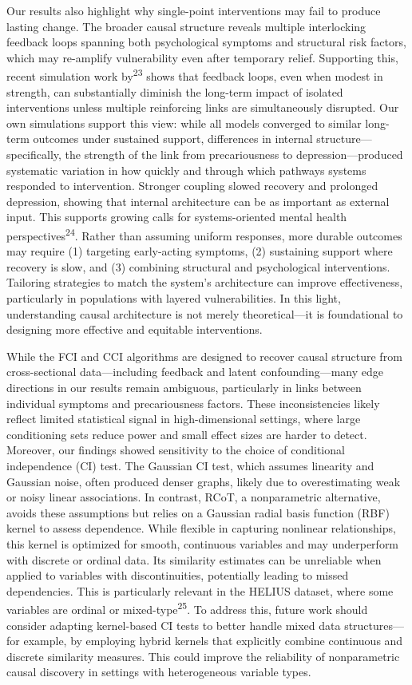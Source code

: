 \documentclass[
]{article}
\begin{document}
Our results also highlight why single-point interventions may fail to
produce lasting change. The broader causal structure reveals multiple
interlocking feedback loops spanning both psychological symptoms and
structural risk factors, which may re-amplify vulnerability even after
temporary relief. Supporting this, recent simulation work
by\textsuperscript{23} shows that feedback loops, even when modest in
strength, can substantially diminish the long-term impact of isolated
interventions unless multiple reinforcing links are simultaneously
disrupted. Our own simulations support this view: while all models
converged to similar long-term outcomes under sustained support,
differences in internal structure---specifically, the strength of the
link from precariousness to depression---produced systematic variation
in how quickly and through which pathways systems responded to
intervention. Stronger coupling slowed recovery and prolonged
depression, showing that internal architecture can be as important as
external input. This supports growing calls for systems-oriented mental
health perspectives\textsuperscript{24}. Rather than assuming uniform
responses, more durable outcomes may require (1) targeting early-acting
symptoms, (2) sustaining support where recovery is slow, and (3)
combining structural and psychological interventions. Tailoring
strategies to match the system's architecture can improve effectiveness,
particularly in populations with layered vulnerabilities. In this light,
understanding causal architecture is not merely theoretical---it is
foundational to designing more effective and equitable interventions.

While the FCI and CCI algorithms are designed to recover causal
structure from cross-sectional data---including feedback and latent
confounding---many edge directions in our results remain ambiguous,
particularly in links between individual symptoms and precariousness
factors. These inconsistencies likely reflect limited statistical signal
in high-dimensional settings, where large conditioning sets reduce power
and small effect sizes are harder to detect. Moreover, our findings
showed sensitivity to the choice of conditional independence (CI) test.
The Gaussian CI test, which assumes linearity and Gaussian noise, often
produced denser graphs, likely due to overestimating weak or noisy
linear associations. In contrast, RCoT, a nonparametric alternative,
avoids these assumptions but relies on a Gaussian radial basis function
(RBF) kernel to assess dependence. While flexible in capturing nonlinear
relationships, this kernel is optimized for smooth, continuous variables
and may underperform with discrete or ordinal data. Its similarity
estimates can be unreliable when applied to variables with
discontinuities, potentially leading to missed dependencies. This is
particularly relevant in the HELIUS dataset, where some variables are
ordinal or mixed-type\textsuperscript{25}. To address this, future work
should consider adapting kernel-based CI tests to better handle mixed
data structures---for example, by employing hybrid kernels that
explicitly combine continuous and discrete similarity measures. This
could improve the reliability of nonparametric causal discovery in
settings with heterogeneous variable types.
\end{document}
